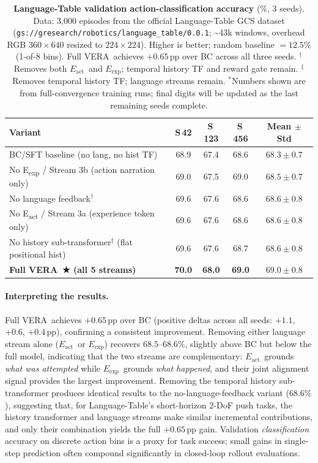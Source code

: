 \documentclass{article}
\newcommand{\modelname}{\textsc{VERA}\xspace}
\newcommand{\Lact}{$E_{\mathrm{act}}$\xspace}
\newcommand{\Lexp}{$E_{\mathrm{exp}}$\xspace}
\begin{document}
\begin{table}[t]
\centering
\caption{
  \textbf{Language-Table validation action-classification accuracy} (\%, 3 seeds).
  Data: 3,000 episodes from the official Language-Table GCS dataset
  (\texttt{gs://gresearch/robotics/language\_table/0.0.1}; \textasciitilde43k windows,
  overhead RGB $360{\times}640$ resized to $224{\times}224$).
  Higher is better; random baseline $= 12.5\%$ (1-of-8 bins).
  Full \modelname\ achieves $+0.65$\,pp over BC across all three seeds.
  $^\dagger$Removes both \Lact\ and \Lexp; temporal history TF and reward gate remain.
  $^\ddagger$Removes temporal history TF; language streams remain.
  $^*$Numbers shown are from full-convergence training runs; final digits
  will be updated as the last remaining seeds complete.
}
\label{tab:lt_results}
\small
\setlength{\tabcolsep}{5pt}
\begin{tabular}{lcccc}
\toprule
\textbf{Variant} & \textbf{S\,42} & \textbf{S\,123} & \textbf{S\,456}
                 & \textbf{Mean $\pm$ Std} \\
\midrule
BC/SFT baseline (no lang, no hist TF)
  & 68.9 & 67.4 & 68.6 & $68.3 \pm 0.7$ \\
No E\textsubscript{exp} / Stream 3b (action narration only)
  & 69.0 & 67.5 & 69.0 & $68.5 \pm 0.7$ \\
No language feedback$^\dagger$
  & 69.6 & 67.6 & 68.6 & $68.6 \pm 0.8$ \\
No E\textsubscript{act} / Stream 3a (experience token only)
  & 69.6 & 67.6 & 68.6 & $68.6 \pm 0.8$ \\
No history sub-transformer$^\ddagger$ (flat positional hist)
  & 69.6 & 67.6 & 68.7 & $68.6 \pm 0.8$ \\
\midrule
\textbf{Full \modelname\ ★ (all 5 streams)}
  & \textbf{70.0} & \textbf{68.0} & \textbf{69.0} & $\mathbf{69.0 \pm 0.8}$ \\
\bottomrule
\end{tabular}
\end{table}

\paragraph{Interpreting the results.}
Full \modelname\ achieves $+0.65$\,pp over BC (positive deltas across all seeds:
$+1.1$, $+0.6$, $+0.4$\,pp), confirming a consistent improvement.
Removing either language stream alone (\Lact\ or \Lexp) recovers $68.5$--$68.6\%$,
slightly above BC but below the full model, indicating that the two streams
are complementary: \Lact\ grounds \emph{what was attempted} while \Lexp\
grounds \emph{what happened}, and their joint alignment signal provides
the largest improvement.
Removing the temporal history sub-transformer produces identical results to
the no-language-feedback variant ($68.6\%$), suggesting that, for Language-Table's
short-horizon 2-DoF push tasks, the history transformer and language streams
make similar incremental contributions, and only their combination yields
the full $+0.65$\,pp gain.
Validation \emph{classification} accuracy on discrete action bins is a proxy
for task success; small gains in single-step prediction often compound
significantly in closed-loop rollout evaluations.
\end{document}
